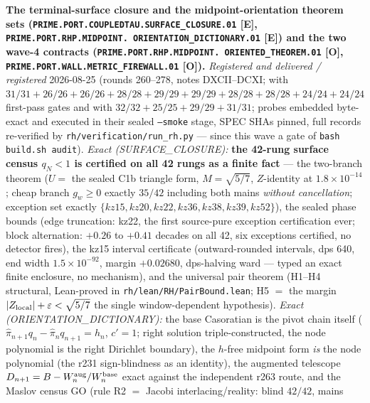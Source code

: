 \par\smallskip\noindent\textbf{The terminal-surface closure and
the midpoint-orientation theorem sets
(\texttt{PRIME.PORT.COUPLEDTAU.\allowbreak SURFACE\_CLOSURE.01}
[E], \texttt{PRIME.PORT.RHP.MIDPOINT.\allowbreak
ORIENTATION\_DICTIONARY.01} [E]) and the two wave-4 contracts
(\texttt{PRIME.PORT.RHP.MIDPOINT.\allowbreak
ORIENTED\_THEOREM.01} [O],
\texttt{PRIME.PORT.WALL.\allowbreak METRIC\_FIREWALL.01} [O]).}
{\sloppy
\emph{Registered and delivered / registered} 2026-08-25 (rounds
260--278, notes DXCII--DCXI;
 with $31/31 + 26/26 +
26/26 + 28/28 + 29/29 + 29/29 + 28/28 + 28/28 + 24/24 + 24/24$
first-pass gates and
 with $32/32 +
25/25 + 29/29 + 31/31$; probes embedded byte-exact and executed
in their sealed \texttt{--smoke} stage, SPEC SHAs pinned, full
records re-verified by \texttt{rh/verification/run\_rh.py} ---
since this wave a gate of \texttt{bash build.sh audit}).
\emph{Exact (SURFACE\_CLOSURE):} \textbf{the 42-rung surface
census $q_N < 1$ is certified on all 42 rungs as a finite fact}
--- the two-branch theorem ($U =$ the sealed C1b triangle form,
$M = \sqrt{5/7}$, $Z$-identity at $1.8\times10^{-14}$; cheap
branch $g_w \ge 0$ exactly $35/42$ including both mains
\emph{without cancellation}; exception set exactly $\{kz15, kz20,
kz22, kz36, kz38, kz39, kz52\}$), the sealed phase bounds (edge
truncation: kz22, the first source-pure exception certification
ever; block alternation: $+0.26$ to $+0.41$ decades on all 42,
six exceptions certified, no detector fires), the kz15 interval
certificate (outward-rounded intervals, dps 640, end width
$1.5\times10^{-92}$, margin $+0.02680$, dps-halving ward ---
typed an exact finite enclosure, no mechanism), and the universal
pair theorem (H1--H4 structural, Lean-proved in
\texttt{rh/lean/RH/PairBound.lean}; H5 $=$ the margin
$|Z_{\rm local}| + \varepsilon < \sqrt{5/7}$ the single
window-dependent hypothesis).  \emph{Exact
(ORIENTATION\_DICTIONARY):} the base Casoratian is the pivot
chain itself ($\hat\pi_{n+1}q_n - \hat\pi_nq_{n+1} = h_n$, $c' =
1$; right solution triple-constructed, the node polynomial is the
right Dirichlet boundary), the $h$-free midpoint form \emph{is}
the node polynomial (the r231 sign-blindness as an identity), the
augmented telescope $D_{n+1} = B - W^{\rm aug}_n/W^{\rm base}_n$
exact against the independent r263 route, and the Maslov census
GO (rule R2 $=$ Jacobi interlacing/reality: blind $42/42$, mains
}
